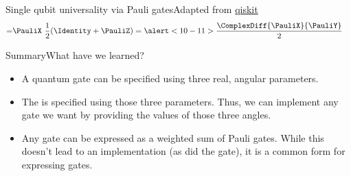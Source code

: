 {\begin{frame}{Single qubit universality via Pauli gates}{Adapted from \href{https://qiskit.org/textbook/ch-gates/proving-universality.html\#pauli}{qiskit}}
{{\begin{align*}
    = & \PauliX\ \frac{1}{2}(\Identity+\PauliZ)
    = \alert<10-11>{\frac{\ComplexDiff{\PauliX}{\PauliY}}{2}}
\end{align*}%
}%
}

\end{frame}}

\begin{frame}{Summary}{What have we learned?}

\begin{itemize}
    \item A quantum gate can be specified using three real, angular parameters.
    \item The  is specified using those three parameters.   Thus, we can implement any gate we want by providing the values of those three angles.
    \item Any gate can be expressed as a weighted sum of Pauli gates.  While this doesn't lead to an implementation (as did the  gate), it is a common form for expressing gates. 
\end{itemize}
    
\end{frame}

